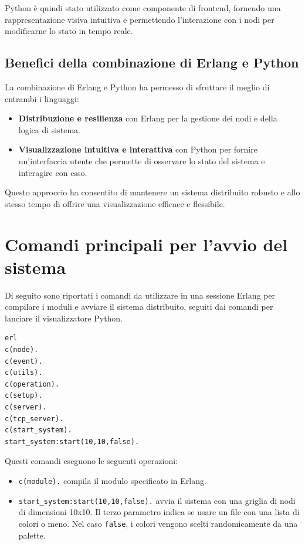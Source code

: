 \documentclass[12pt, a4paper]{report}
\begin{document}
Python è quindi stato utilizzato come componente di frontend, fornendo una rappresentazione visiva intuitiva e permettendo l'interazione con i nodi per modificarne lo stato in tempo reale.

\subsection{Benefici della combinazione di Erlang e Python}

La combinazione di Erlang e Python ha permesso di sfruttare il meglio di entrambi i linguaggi:
\begin{itemize}
    \item \textbf{Distribuzione e resilienza} con Erlang per la gestione dei nodi e della logica di sistema.
    \item \textbf{Visualizzazione intuitiva e interattiva} con Python per fornire un’interfaccia utente che permette di osservare lo stato del sistema e interagire con esso.
\end{itemize}

Questo approccio ha consentito di mantenere un sistema distribuito robusto e allo stesso tempo di offrire una visualizzazione efficace e flessibile.


\section{Comandi principali per l'avvio del sistema}

Di seguito sono riportati i comandi da utilizzare in una sessione Erlang per compilare i moduli e avviare il sistema distribuito, seguiti dai comandi per lanciare il visualizzatore Python.

\begin{tcolorbox}[title=Comandi di Avvio in Erlang]
\begin{verbatim}
erl 
c(node).
c(event).
c(utils).
c(operation).
c(setup).
c(server).
c(tcp_server).
c(start_system).
start_system:start(10,10,false).
\end{verbatim}
\end{tcolorbox}

Questi comandi eseguono le seguenti operazioni:
\begin{itemize}
    \item \texttt{c(module).} compila il modulo specificato in Erlang.
    \item \texttt{start\_system:start(10,10,false).} avvia il sistema con una griglia di nodi di dimensioni 10x10. Il terzo parametro indica se usare un file con una lista di colori o meno. Nel caso \texttt{false}, i colori vengono scelti randomicamente da una palette.
\end{itemize}
\end{document}
